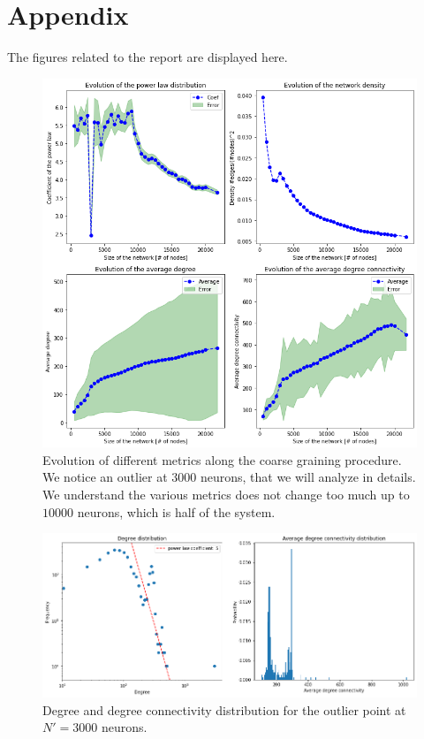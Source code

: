 \section{Appendix}
The figures related to the report are displayed here.

\begin{figure}[h]
    \centering
    \includegraphics[width=\textwidth]{Images/Coarse/Evolution_graph_coearse.png}
    \caption{Evolution of different metrics along the coarse graining procedure.
    We notice an outlier at $3000$ neurons, that we will analyze in details. We understand
    the various metrics does not change too much up to $10000$ neurons, which is half 
    of the system.}
    \label{fig:coarse_evol}
\end{figure}

\begin{figure}
    \centering
    \includegraphics[width=\textwidth]{Images/Coarse/Outlier_distribution.png}
    \caption{Degree and degree connectivity distribution for the outlier point at $N'=3000$ neurons.}
    \label{fig:n3000}
\end{figure}

